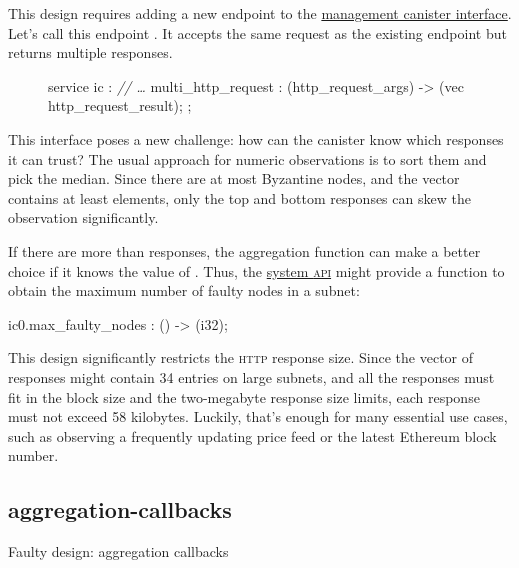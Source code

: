 \documentclass{article}
\begin{document}
This design requires adding a new endpoint to the \href{https://internetcomputer.org/docs/current/references/ic-interface-spec/#ic-management-canister}{management canister interface}.
Let's call this endpoint .
It accepts the same request as the existing \href{https://internetcomputer.org/docs/current/references/ic-interface-spec/#ic-http_request}{} endpoint but returns multiple responses.

\begin{figure}
\begin{code}[candid]
service ic : {
    \emph{// \ldots}
    multi_http_request : (http_request_args) -> (vec http_request_result);
};
\end{code}
\end{figure}

This interface poses a new challenge: how can the canister know which responses it can trust?
The usual approach for numeric observations is to sort them and pick the median. 
Since there are at most  Byzantine nodes, and the  vector contains at least  elements, only the top and bottom  responses can skew the observation significantly.

If there are more than  responses, the aggregation function can make a better choice if it knows the value of .
Thus, the \href{https://internetcomputer.org/docs/current/references/ic-interface-spec/#system-api}{system \textsc{api}} might provide a function to obtain the maximum number of faulty nodes in a subnet:

\begin{code}
ic0.max_faulty_nodes : () -> (i32);
\end{code}

This design significantly restricts the \textsc{http} response size.
Since the vector of responses might contain 34 entries on large subnets, and all the responses must fit in the block size and the two-megabyte response size limits, each response must not exceed 58 kilobytes.
Luckily, that's enough for many essential use cases, such as observing a frequently updating price feed or the latest Ethereum block number.

\subsection{aggregation-callbacks}{Faulty design: aggregation callbacks}
\end{document}
